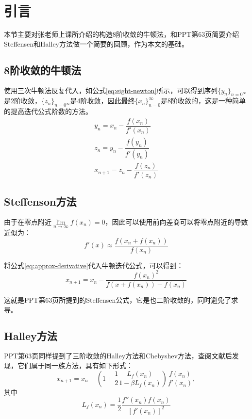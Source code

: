 
\section{引言}

本节主要对张老师上课所介绍的构造8阶收敛的牛顿法，和PPT第63页简要介绍Steffensen和Halley方法做一个简要的回顾，作为本文的基础。

\subsection{8阶收敛的牛顿法}

使用三次牛顿法反复代入，如公式\ref{eq:eight-newton}所示，可以得到序列$\{y_n\}_{n=0^\infty}$是2阶收敛，$\{z_n\}_{n=0^\infty}$是4阶收敛，因此最终$\{x_n\}_{n=0}^{\infty}$是8阶收敛的，这是一种简单的提高迭代公式阶数的方法。
\begin{equation}
    \label{eq:eight-newton}
    \begin{aligned}
        y_n = x_n - \dfrac{f(x_n)}{f'(x_n)}\\
        z_n = y_n - \dfrac{f(y_n)}{f'(y_n)}\\
        x_{n+1} = z_n - \dfrac{f(z_n)}{f'(z_n)}
    \end{aligned}
\end{equation}


\subsection{Steffenson方法}

由于在零点附近$\lim\limits_{n\to \infty}f(x_n)=0$，因此可以使用前向差商可以将零点附近的导数近似为：
\begin{equation}
    \label{eq:approx-derivative}
    f'(x)\approx \dfrac{f(x_n+f(x_n))}{f(x_n)}
\end{equation}

将公式\ref{eq:approx-derivative}代入牛顿迭代公式，可以得到：
\begin{equation}
    \label{eq:newton-nodev}
    x_{n+1}=x_n-\dfrac{f(x_n)^2}{f(x+f(x_n))-f(x_n)}
\end{equation}

这就是PPT第63页所提到的Steffensen公式，它是也二阶收敛的\cite{jain2007steffensen}，同时避免了求导。

\subsection{Halley方法}

PPT第63页同样提到了三阶收敛的Halley方法和Chebyshev方法，查阅文献\cite{gutierrez1997family}后发现，它们属于同一族方法，具有如下形式：
\begin{equation}
    x_{n+1} = x_n-\left( 1 + \dfrac{1}{2}\dfrac{L_f(x_n)}{1-\beta L_f(x_n)} \right) \dfrac{f(x_n)}{f'(x_n)},
\end{equation}
其中
\begin{equation}
    L_f(x_n) = \dfrac{1}{2}\dfrac{f''(x_n)f(x_n)}{[f'(x_n)]^2}
\end{equation}

